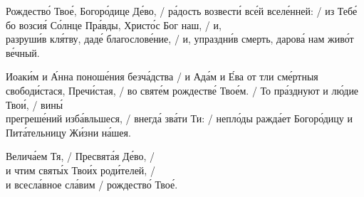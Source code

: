 \documentclass{article}
\begin{document}
%
%
Рождество́ Твое́, Богоро́дице Де́во, /
ра́дость возвести́ все́й вселе́нней: /
из Тебе́ бо возсия́ Со́лнце Пра́вды, Христо́с Бог наш, /
и, \\
разруши́в кля́тву, даде́ благослове́ние, /
и, упраздни́в смерть, дарова́ нам живо́т ве́чный.

%
Иоаки́м и А́нна поноше́ния безча́дства /
и Ада́м и Е́ва от тли сме́ртныя свободи́стася, Пречи́стая, /
во святе́м рождестве́ Твое́м. /
То пра́зднуют и лю́дие Твои́, /
вины́ \\
прегреше́ний изба́вльшеся, /
внегда́ зва́ти Ти: /
непло́ды ражда́ет Богоро́дицу и \\
Пита́тельницу Жи́зни на́шея.

%
Велича́ем Тя, /
Пресвята́я Де́во, /\\
и чтим святы́х Твои́х роди́телей, /\\
и всесла́вное сла́вим /
рождество́ Твое́.
\end{document}
